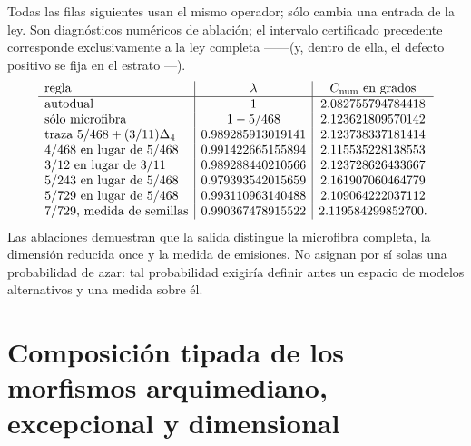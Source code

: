 Todas las filas siguientes usan el mismo operador; sólo cambia una entrada
de la ley. Son diagnósticos numéricos de ablación; el intervalo certificado
precedente corresponde exclusivamente a la ley completa
\HTr--\HAdd--\HDef--\HRes--\HLoc (y, dentro de ella, el defecto positivo se fija en el
estrato \HTr--\HAdd--\HDef).
\[
\begin{array}{l|c|c}
\text{regla}&\lambda&C_{\rm num}\text{ en grados}\\ \hline
\text{autodual}&1&2.082755794784418\\
\text{sólo microfibra}&1-5/468&2.123621809570142\\
\text{traza }5/468+(3/11)\Delta_4
&0.989285913019141&2.123738337181414\\
4/468\text{ en lugar de }5/468
&0.991422665155894&2.115535228138553\\
3/12\text{ en lugar de }3/11
&0.989288440210566&2.123728626433667\\
5/243\text{ en lugar de }5/468
&0.979393542015659&2.161907060464779\\
5/729\text{ en lugar de }5/468
&0.993110963140488&2.109064222037112\\
7/729\text{, medida de semillas}
&0.990367478915522&2.119584299852700.
\end{array}
\]
Las ablaciones demuestran que la salida distingue la microfibra completa,
la dimensión reducida once y la medida de emisiones. No asignan por sí
solas una probabilidad de azar: tal probabilidad exigiría definir antes un
espacio de modelos alternativos y una medida sobre él.

\section{Composición tipada de los morfismos arquimediano, excepcional y dimensional}

